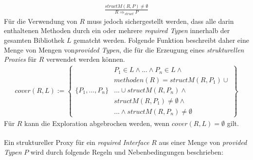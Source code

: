 \documentclass[a4paper,12pt]{article}
\begin{document}
\begin{gather*}
\frac{structM(R,P) \neq \emptyset}{R \Rightarrow_{struct}P}
\end{gather*}
\noindent
Für die Verwendung von $R$ muss jedoch sichergestellt werden, dass alle darin enthaltenen
Methoden durch ein oder mehrere \emph{required Typen} innerhalb der gesamten Bibliothek $L$ gematcht werden. Folgende Funktion beschreibt daher eine Menge von Mengen von\emph{provided Typen}, die für die Erzeugung eines \emph{strukturellen Proxies} für $R$ verwendet werden können.
\begin{gather*}
cover(R,L) := 
\left\{\begin{array}{l|l}
					& P_1 \in L \wedge \text{...} \wedge P_n \in L \wedge \\
					& methoden(R) = structM(R,P_1) \cup \\
	\{P_1,...,P_n\}	& \texttt{...} \cup structM(R, P_n) \wedge \\
					& \mathit{structM(R,P_1)} \neq \emptyset \wedge \\
					& \texttt{...}\wedge \mathit{structM(R,P_n)} \neq \emptyset 
\end{array}\right\}
\end{gather*}
Für $R$ kann die Exploration abgebrochen werden, wenn $cover(R,L) = \emptyset$ gilt.\\\\
Ein struktureller Proxy für ein \emph{required Interface} $R$ aus einer Menge von  \emph{provided Typen} $P$ wird durch folgende Regeln und Nebenbedingungen beschrieben:
\end{document}
